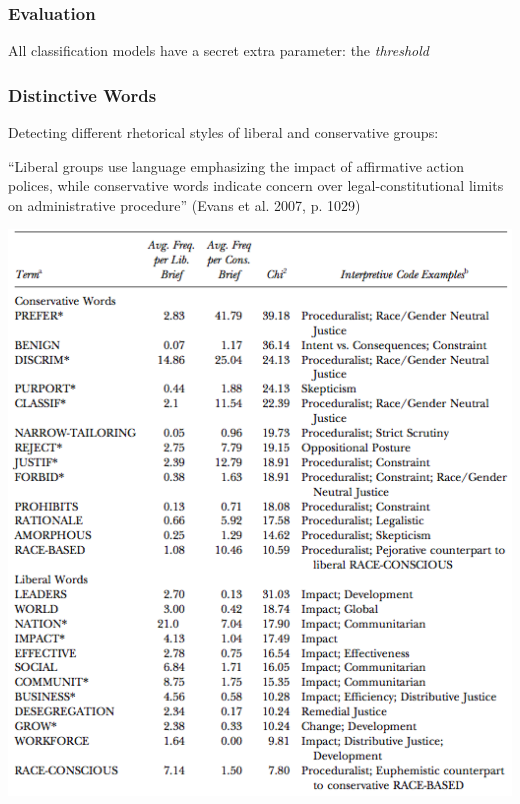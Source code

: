 \documentclass[11pt,compress,professionalfonts]{beamer}
\begin{document}
\begin{frame}[t,fragile]\frametitle{Evaluation}

All classification models have a secret extra parameter: the \textit{threshold}

\end{frame}
\begin{frame}[t,fragile]\frametitle{Distinctive Words}

Detecting different rhetorical styles of liberal and conservative groups:

``Liberal groups use language emphasizing the impact of affirmative action polices, while conservative words indicate concern over legal-constitutional limits on administrative procedure'' (Evans et al. 2007, p. 1029)

\newpage

\centerline{\includegraphics[scale=.6]{pictures/words-evans}}
%
%
%

\end{frame}
\end{document}
